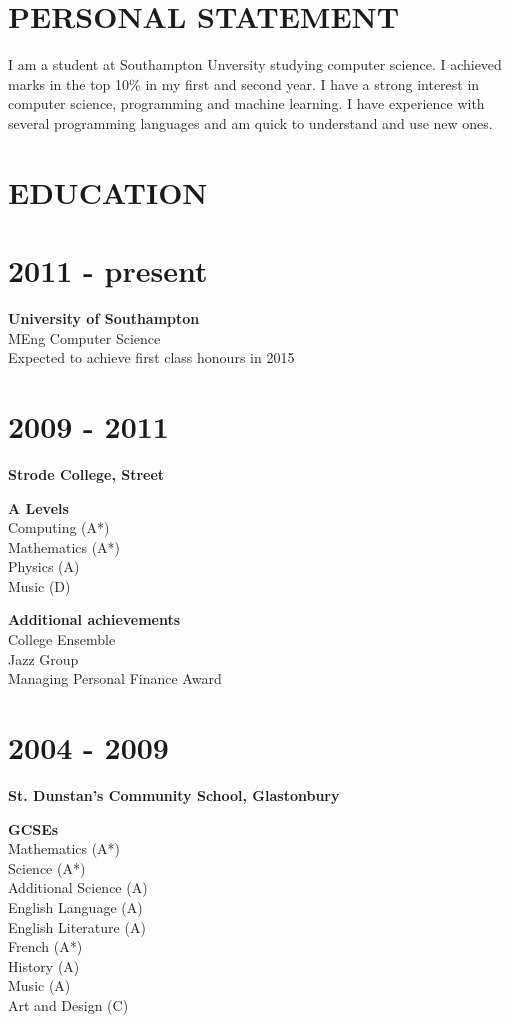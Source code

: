 \documentclass[margin]{res}
\begin{document}
\begin{resume}

\section{PERSONAL STATEMENT}
	I am a student at Southampton Unversity studying computer science. I achieved marks in the top 10\% in my first and second year. I have a strong interest in computer science, programming and machine learning. I have experience with  several programming languages and am quick to understand and use new ones.

\section{EDUCATION}
\normalsize{\section{2011 - present}}
	{\bf University of Southampton} \\
	MEng Computer Science \\
	Expected to achieve first class honours in 2015
\normalsize{\section{2009 - 2011}}
	{\bf Strode College, Street}

	{\bf A Levels} \\
	Computing (A*) \\
	Mathematics (A*) \\
	Physics (A) \\
	Music (D)

	{\bf Additional achievements} \\
	College Ensemble \\
	Jazz Group \\
	Managing Personal Finance Award

\normalsize{\section{2004 - 2009}}
	{\bf St. Dunstan's Community School, Glastonbury}

	{\bf GCSEs} \\
	Mathematics (A*) \\
	Science (A*) \\
	Additional Science (A) \\
	English Language (A) \\
	English Literature (A) \\
	French (A*) \\
	History (A) \\
	Music (A) \\
	Art and Design (C)


\end{resume}
\end{document}
